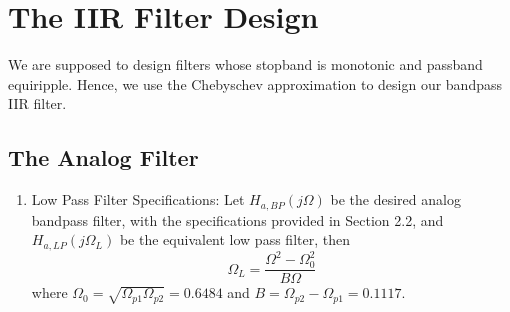 \documentclass{article}
\begin{document}
\section{The IIR Filter Design}
We are supposed to design filters whose stopband is monotonic and passband equiripple.
Hence, we use the Chebyschev approximation to design our bandpass IIR filter.
\subsection{The Analog Filter}
\begin{enumerate}

\item {Low Pass Filter Specifications:}  Let $H_{a, BP}(j\Omega)$ be the desired analog bandpass filter,  with the specifications provided in Section 2.2, and $H_{a,LP}(j\Omega_L)$ be the equivalent low pass filter, then
\begin{equation}
\Omega_L = \frac{\Omega^2 - \Omega_0^2}{B\Omega} \label{eq:freq_transform}
\end{equation}
where $\Omega_0 = \sqrt{\Omega_{p1}\Omega_{p2}} = 0.6484$ and $B = \Omega_{p2} - \Omega_{p1} = 0.1117$.


\end{enumerate}
\end{document}
